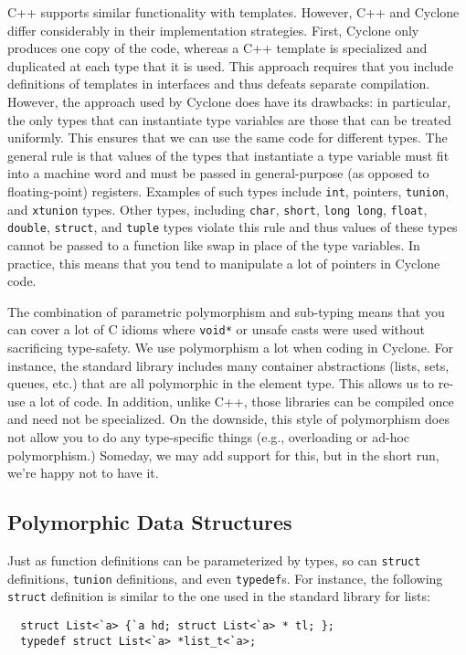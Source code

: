 C++ supports similar functionality with templates.  However, C++ and
Cyclone differ considerably in their implementation strategies.
First, Cyclone only produces one copy of the code, whereas a C++
template is specialized and duplicated at each type that it is used.
This approach requires that you include definitions of templates in
interfaces and thus defeats separate compilation.  However, the
approach used by Cyclone does have its drawbacks: in particular, the
only types that can instantiate type variables are those that can be
treated uniformly.  This ensures that we can use the same code for
different types.  The general rule is that values of the types that
instantiate a type variable must fit into a machine word and must be
passed in general-purpose (as opposed to floating-point) registers.
Examples of such types include \texttt{int}, pointers, \texttt{tunion},
and \texttt{xtunion} types.  Other types, including \texttt{char},
\texttt{short}, \texttt{long long}, \texttt{float}, \texttt{double},
\texttt{struct}, and \texttt{tuple} types violate this rule and thus
values of these types cannot be passed to a function like swap in
place of the type variables. In practice, this means that you tend to
manipulate a lot of pointers in Cyclone code.

The combination of parametric polymorphism and sub-typing means that
you can cover a lot of C idioms where \texttt{void*} or unsafe casts
were used without sacrificing type-safety.  We use polymorphism a lot
when coding in Cyclone.  For instance, the standard library includes
many container abstractions (lists, sets, queues, etc.) that are all
polymorphic in the element type.  This allows us to re-use a lot of
code.  In addition, unlike C++, those libraries can be compiled once
and need not be specialized.  On the downside, this style of
polymorphism does not allow you to do any type-specific things (e.g.,
overloading or ad-hoc polymorphism.)  Someday, we may add support for
this, but in the short run, we're happy not to have it.


\subsection{Polymorphic Data Structures}
Just as function definitions can be parameterized by types, so can
\texttt{struct} definitions, \texttt{tunion} definitions, and even
\texttt{typedef}s.  For instance, the following \texttt{struct} definition
is similar to the one used in the standard library for lists:
\begin{verbatim}
  struct List<`a> {`a hd; struct List<`a> * tl; };
  typedef struct List<`a> *list_t<`a>;
\end{verbatim}

